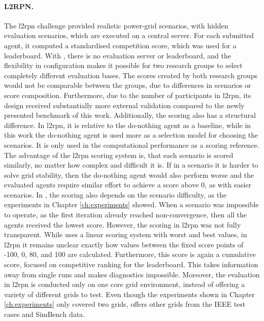 \paragraph{L2RPN.}
The \ac{l2rpn} challenge provided realistic power-grid scenarios, with hidden evaluation scenarios, which are executed on a central server. For each submitted agent, it computed a standardised competition score, which was used for a leaderboard. With \benchmark, there is no evaluation server or leaderboard, and the flexibility in configuration makes it possible for two research groups to select completely different evaluation bases. The scores created by both research groups would not be comparable between the groups, due to differences in scenarios or score composition. Furthermore, due to the number of participants in \ac{l2rpn}, its design received substantially more external validation compared to the newly presented benchmark of this work. Additionally, the scoring also has a structural difference. In \ac{l2rpn}, it is relative to the do-nothing agent as a baseline, while in this work the do-nothing agent is used more as a selection model for choosing the scenarios. It is only used in the computational performance as a scoring reference. The advantage of the \ac{l2rpn} scoring system is, that each scenario is scored similarly, no matter how complex and difficult it is. If in a scenario it is harder to solve grid stability, then the do-nothing agent would also perform worse and the evaluated agents require similar effort to achieve a score above 0, as with easier scenarios. In \benchmark, the scoring also depends on the scenario difficulty, as the experiments in Chapter \ref{ch:experiments} showed. When a scenario was impossible to operate, as the first iteration already reached non-convergence, then all the agents received the lowest score. However, the scoring in \ac{l2rpn} was not fully transparent. While \benchmark uses a linear scoring system with worst and best values, in \ac{l2rpn} it remains unclear exactly how values between the fixed score points of -100, 0, 80, and 100 are calculated. Furthermore, this score is again a cumulative score, focused on competitive ranking for the leaderboard. This takes information away from single runs and makes diagnostics impossible. Moreover, the evaluation in \ac{l2rpn} is conducted only on one core grid environment, instead of offering a variety of different grids to test. Even though the experiments shown in Chapter \ref{ch:experiments} only covered two grids, \benchmark offers other grids from the IEEE test cases and SimBench data.

